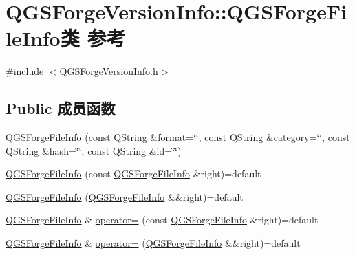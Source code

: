 \hypertarget{class_q_g_s_forge_version_info_1_1_q_g_s_forge_file_info}{}\section{Q\+G\+S\+Forge\+Version\+Info\+:\+:Q\+G\+S\+Forge\+File\+Info类 参考}
\label{class_q_g_s_forge_version_info_1_1_q_g_s_forge_file_info}


{\ttfamily \#include $<$Q\+G\+S\+Forge\+Version\+Info.\+h$>$}

\subsection*{Public 成员函数}
\begin{DoxyCompactItemize}
\item 
\mbox{\hyperlink{class_q_g_s_forge_version_info_1_1_q_g_s_forge_file_info_ad5dac531ed0582c20fc33f3675f9ba6e}{Q\+G\+S\+Forge\+File\+Info}} (const Q\+String \&format=\char`\"{}\char`\"{}, const Q\+String \&category=\char`\"{}\char`\"{}, const Q\+String \&hash=\char`\"{}\char`\"{}, const Q\+String \&id=\char`\"{}\char`\"{})
\item 
\mbox{\hyperlink{class_q_g_s_forge_version_info_1_1_q_g_s_forge_file_info_ab408c94be87cb2a6b89cadf0498fca2c}{Q\+G\+S\+Forge\+File\+Info}} (const \mbox{\hyperlink{class_q_g_s_forge_version_info_1_1_q_g_s_forge_file_info}{Q\+G\+S\+Forge\+File\+Info}} \&right)=default
\item 
\mbox{\hyperlink{class_q_g_s_forge_version_info_1_1_q_g_s_forge_file_info_a6e468750a26e4911b85021544a0e3626}{Q\+G\+S\+Forge\+File\+Info}} (\mbox{\hyperlink{class_q_g_s_forge_version_info_1_1_q_g_s_forge_file_info}{Q\+G\+S\+Forge\+File\+Info}} \&\&right)=default
\item 
\mbox{\hyperlink{class_q_g_s_forge_version_info_1_1_q_g_s_forge_file_info}{Q\+G\+S\+Forge\+File\+Info}} \& \mbox{\hyperlink{class_q_g_s_forge_version_info_1_1_q_g_s_forge_file_info_a13b1f0eff5490c907bdc4adfebd71813}{operator=}} (const \mbox{\hyperlink{class_q_g_s_forge_version_info_1_1_q_g_s_forge_file_info}{Q\+G\+S\+Forge\+File\+Info}} \&right)=default
\item 
\mbox{\hyperlink{class_q_g_s_forge_version_info_1_1_q_g_s_forge_file_info}{Q\+G\+S\+Forge\+File\+Info}} \& \mbox{\hyperlink{class_q_g_s_forge_version_info_1_1_q_g_s_forge_file_info_a0bd3e8a560c881089db47d833ccce67e}{operator=}} (\mbox{\hyperlink{class_q_g_s_forge_version_info_1_1_q_g_s_forge_file_info}{Q\+G\+S\+Forge\+File\+Info}} \&\&right)=default

\end{DoxyCompactItemize}
